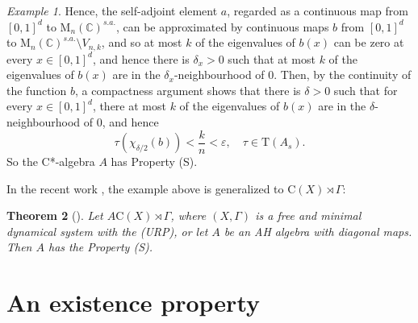 \documentclass[12pt, oneside, psamsfonts]{amsart}
\newtheorem{thm}{Theorem}[section]
\theoremstyle{definition}
\theoremstyle{remark}
\newtheorem{example}[thm]{Example}
\numberwithin{equation}{section}
\newcommand{\Comp}{\mathbb C}
\newcommand{\eps}{\varepsilon}
\newcommand{\tr}{\mathrm{T}}
\begin{document}
\begin{example}
Hence, the self-adjoint element $a$, regarded as a continuous map from $[0, 1]^d$ to $\mathrm{M}_n(\Comp)^{s.a.}$, can be approximated by continuous maps $b$ from $[0, 1]^d$ to $\mathrm{M}_n(\Comp)^{s.a.} \setminus V_{n, k}$, and so at most $k$ of the eigenvalues of $b(x)$ can be zero at every $x \in [0, 1]^d$, and hence there is $\delta_x>0$ such that at most $k$ of the eigenvalues of $b(x)$ are in the $\delta_x$-neighbourhood of $0$. Then, by  the continuity of the function $b$, a compactness argument shows that there is $\delta>0$ such that for every $x\in [0, 1]^d$, there at most $k$ of the eigenvalues of $b(x)$ are in the $\delta$-neighbourhood of $0$, and hence
$$ \tau(\chi_{\delta/2}(b)) < \frac{k}{n} < \eps,\quad \tau \in \tr(A_s).$$
So the C*-algebra $A$ has Property (S).


\end{example}

In the recent work \cite{Vaccaro:2026aa}, the example above is generalized to $\mathrm{C}(X)\rtimes \Gamma$:
\begin{thm}[\cite{Vaccaro:2026aa}]\label{S-holds}
Let $A \mathrm{C}(X) \rtimes \Gamma $, where $(X, \Gamma)$ is a free and minimal dynamical system with the (URP), or let $A$ be an AH algebra with diagonal maps. Then $A$ has the Property (S).
\end{thm}

\section{An existence property}









\end{document}
